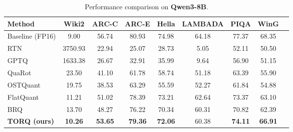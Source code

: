 \begin{table}[!ht]
\centering
\caption{Performance comparison on \textbf{Qwen3-8B}.}
\label{tab:qwen3_8b_full}
\begin{tabular}{lcccccccc}
\toprule
\textbf{Method} & \textbf{Wiki2} & \textbf{ARC-C} & \textbf{ARC-E} & \textbf{Hella} & \textbf{LAMBADA} & \textbf{PIQA} & \textbf{WinG} \\
\midrule
Baseline (FP16) & 9.00 & 56.74 & 80.93 & 74.98 & 64.18 & 77.37 & 68.35 \\
\midrule
RTN & 3750.93 & 22.94 & 25.07 & 28.73 & 5.05 & 52.11 & 50.50 \\
GPTQ & 1633.38 & 26.67 & 32.91 & 35.99 & 9.64 & 56.90 & 51.15 \\
QuaRot & 23.50 & 41.10 & 61.78 & 58.74 & 51.18 & 63.39 & 55.90 \\
OSTQuant & 19.75 & 38.53 & 63.29 & 55.59 & 52.27 & 61.84 & 54.88 \\
FlatQuant & 11.21 & 51.02 & 78.39 & 73.21 & 62.64 & 73.37 & 63.10 \\
BRQ & 13.70 & 48.27 & 76.22 & 70.34 & 60.31 & 70.82 & 62.39 \\
\textbf{TORQ (ours)} & \textbf{10.26} & \textbf{53.65} & \textbf{79.36} & \textbf{72.06} & 60.38 & \textbf{74.11} & \textbf{66.91} \\
\bottomrule
\end{tabular}
\end{table}